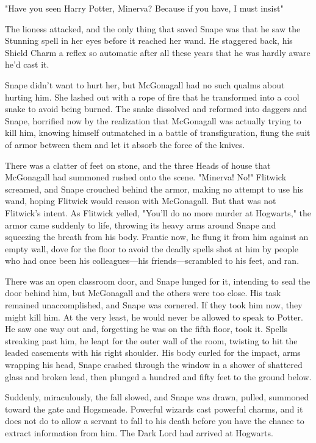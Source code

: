 "Have you seen Harry Potter, Minerva? Because if you have, I must insist{\el}"

The lioness attacked, and the only thing that saved Snape was that he saw the Stunning spell in her eyes before it reached her wand. He staggered back, his Shield Charm a reflex so automatic after all these years that he was hardly aware he'd cast it.

Snape didn't want to hurt her, but McGonagall had no such qualms about hurting him. She lashed out with a rope of fire that he transformed into a cool snake to avoid being burned. The snake dissolved and reformed into daggers and Snape, horrified now by the realization that McGonagall was actually trying to kill him, knowing himself outmatched in a battle of transfiguration, flung the suit of armor between them and let it absorb the force of the knives.

There was a clatter of feet on stone, and the three Heads of house that McGonagall had summoned rushed onto the scene. "Minerva! No!" Flitwick screamed, and Snape crouched behind the armor, making no attempt to use his wand, hoping Flitwick would reason with McGonagall. But that was not Flitwick's intent. As Flitwick yelled, "You'll do no more murder at Hogwarts," the armor came suddenly to life, throwing its heavy arms around Snape and squeezing the breath from his body. Frantic now, he flung it from him against an empty wall, dove for the floor to avoid the deadly spells shot at him by people who had once been his colleagues—his friends—scrambled to his feet, and ran.

There was an open classroom door, and Snape lunged for it, intending to seal the door behind him, but McGonagall and the others were too close. His task remained unaccomplished, and Snape was cornered. If they took him now, they might kill him. At the very least, he would never be allowed to speak to Potter. He saw one way out and, forgetting he was on the fifth floor, took it. Spells streaking past him, he leapt for the outer wall of the room, twisting to hit the leaded casements with his right shoulder. His body curled for the impact, arms wrapping his head, Snape crashed through the window in a shower of shattered glass and broken lead, then plunged a hundred and fifty feet to the ground below.

Suddenly, miraculously, the fall slowed, and Snape was drawn, pulled, summoned toward the gate and Hogsmeade. Powerful wizards cast powerful charms, and it does not do to allow a servant to fall to his death before you have the chance to extract information from him. The Dark Lord had arrived at Hogwarts.

